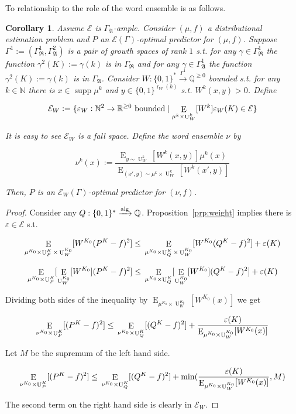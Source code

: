 \documentclass{article}
\numberwithin{equation}{section}
\theoremstyle{definition}
\theoremstyle{plain}
\newtheorem{corollary}{Corollary}[section]
\newcommand{\Bool}{\{0,1\}}
\newcommand{\Words}{{\Bool^*}}
\newcommand{\WordsLen}[1]{{\Bool^{#1}}}
\DeclareMathOperator{\Supp}{supp}
\DeclareMathOperator{\E}{E}
\DeclareMathOperator{\R}{r}
\DeclareMathOperator{\Un}{U}
\newcommand{\Nats}{\mathbb{N}}
\newcommand{\Rats}{\mathbb{Q}}
\newcommand{\Reals}{\mathbb{R}}
\newcommand{\GrowR}{\Gamma_{\mathfrak{R}}}
\newcommand{\GrowA}{\Gamma_{\mathfrak{A}}}
\newcommand{\Fall}{\mathcal{E}}
\newcommand{\EG}{\Fall(\Gamma)}
\newcommand{\Alg}{\xrightarrow{\textnormal{alg}}}
\begin{document}
To relationship to the role of the word ensemble is as follows.

\begin{samepage}
\begin{corollary}

Assume $\Fall$ is $\GrowA$-ample. Consider $(\mu,f)$ a distributional estimation problem and $P$ an $\EG$-optimal predictor for $(\mu,f)$. Suppose ${\Gamma^1:=(\GrowR^1,\GrowA^2)}$ is a pair of growth spaces of rank $1$ s.t. for any $\gamma \in \GrowR^1$ the function ${\gamma^2(K):=\gamma(k)}$ is in $\GrowR$ and for any $\gamma \in \GrowA^1$ the function $\gamma^2(K):=\gamma(k)$ is in $\GrowA$. Consider ${W: \Words \xrightarrow{\Gamma^1} \Rats^{\geq 0}}$ bounded s.t. for any $k \in \Nats$ there is $x \in \Supp \mu^k$ and $y \in \WordsLen{\R_W(k)}$ s.t. $W^k(x,y) > 0$. Define 

$${\Fall_W:=\{\varepsilon_W: \Nats^2 \rightarrow \Reals^{\geq 0} \textnormal{ bounded} \mid  \E_{\mu^k \times \Un_W^k}[W^k]\varepsilon_W(K) \in \Fall\}}$$

It is easy to see $\Fall_W$ is a fall space. Define the word ensemble $\nu$ by 

\[\nu^k(x):=\frac{\E_{y \sim \Un_W^k}[W^k(x,y)] \mu^k(x)}{\E_{(x',y) \sim \mu^k \times \Un_W^k}[W^k(x',y)]}\]

Then, $P$ is an $\Fall_W(\Gamma)$-optimal predictor for $(\nu,f)$.

\end{corollary}
\end{samepage}

\begin{proof}

Consider any $Q: \Words \Alg \Rats$. Proposition~\ref{prp:weight} implies there is $\varepsilon \in \Fall$ s.t.

$$\E_{\mu^{K_0} \times \Un_P^{K} \times \Un_W^{K_0}}[W^{K_0}(P^{K} - f)^2] \leq \\ \E_{\mu^{K_0} \times \Un_Q^{K} \times \Un_W^{K_0}}[W^{K_0}(Q^{K} - f)^2] + \varepsilon(K)$$

$$\E_{\mu^{K_0} \times \Un_P^{K}}[\E_{\Un_W^{K_0}}[W^{K_0}](P^{K} - f)^2] \leq \\ \E_{\mu^{K_0} \times \Un_Q^{K}}[\E_{\Un_W^{K_0}}[W^{K_0}](Q^{K} - f)^2] + \varepsilon(K)$$

Dividing both sides of the inequality by $\E_{\mu^{K_0} \times \Un_W^{K_0}}[W^{K_0}(x)]$ we get

$$\E_{\nu^{K_0} \times \Un_P^{K}}[(P^{K} - f)^2] \leq \\ \E_{\nu^{K_0} \times \Un_Q^{K}}[(Q^{K} - f)^2] + \frac{\varepsilon(K)}{\E_{\mu^{K_0} \times \Un_W^{K_0}}[W^{K_0}(x)]}$$

Let $M$ be the supremum of the left hand side.

$$\E_{\nu^{K_0} \times \Un_P^{K}}[(P^{K} - f)^2] \leq \\ \E_{\nu^{K_0} \times \Un_Q^{K}}[(Q^{K} - f)^2] + \min(\frac{\varepsilon(K)}{\E_{\mu^{K_0} \times \Un_W^{K_0}}[W^{K_0}(x)]},M)$$

The second term on the right hand side is clearly in $\Fall_W$.
\end{proof}
\end{document}
